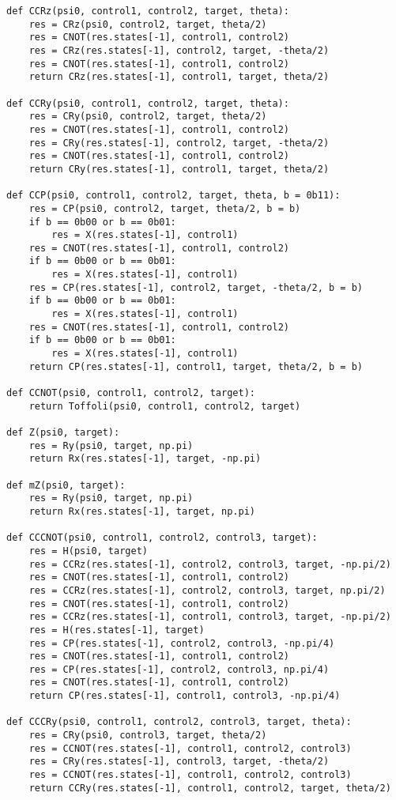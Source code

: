 \begin{verbatim}
def CCRz(psi0, control1, control2, target, theta):
    res = CRz(psi0, control2, target, theta/2)
    res = CNOT(res.states[-1], control1, control2)
    res = CRz(res.states[-1], control2, target, -theta/2)
    res = CNOT(res.states[-1], control1, control2)
    return CRz(res.states[-1], control1, target, theta/2)

def CCRy(psi0, control1, control2, target, theta):
    res = CRy(psi0, control2, target, theta/2)
    res = CNOT(res.states[-1], control1, control2)
    res = CRy(res.states[-1], control2, target, -theta/2)
    res = CNOT(res.states[-1], control1, control2)
    return CRy(res.states[-1], control1, target, theta/2)

def CCP(psi0, control1, control2, target, theta, b = 0b11):
    res = CP(psi0, control2, target, theta/2, b = b)
    if b == 0b00 or b == 0b01:
        res = X(res.states[-1], control1)
    res = CNOT(res.states[-1], control1, control2)
    if b == 0b00 or b == 0b01:
        res = X(res.states[-1], control1)
    res = CP(res.states[-1], control2, target, -theta/2, b = b)
    if b == 0b00 or b == 0b01:
        res = X(res.states[-1], control1)
    res = CNOT(res.states[-1], control1, control2)
    if b == 0b00 or b == 0b01:
        res = X(res.states[-1], control1)
    return CP(res.states[-1], control1, target, theta/2, b = b)

def CCNOT(psi0, control1, control2, target):
    return Toffoli(psi0, control1, control2, target)

def Z(psi0, target):
    res = Ry(psi0, target, np.pi)
    return Rx(res.states[-1], target, -np.pi)

def mZ(psi0, target):
    res = Ry(psi0, target, np.pi)
    return Rx(res.states[-1], target, np.pi)

def CCCNOT(psi0, control1, control2, control3, target):
    res = H(psi0, target)
    res = CCRz(res.states[-1], control2, control3, target, -np.pi/2)
    res = CNOT(res.states[-1], control1, control2)
    res = CCRz(res.states[-1], control2, control3, target, np.pi/2)
    res = CNOT(res.states[-1], control1, control2)
    res = CCRz(res.states[-1], control1, control3, target, -np.pi/2)
    res = H(res.states[-1], target)
    res = CP(res.states[-1], control2, control3, -np.pi/4)
    res = CNOT(res.states[-1], control1, control2)
    res = CP(res.states[-1], control2, control3, np.pi/4)
    res = CNOT(res.states[-1], control1, control2)
    return CP(res.states[-1], control1, control3, -np.pi/4)

def CCCRy(psi0, control1, control2, control3, target, theta):
    res = CRy(psi0, control3, target, theta/2)
    res = CCNOT(res.states[-1], control1, control2, control3)
    res = CRy(res.states[-1], control3, target, -theta/2)
    res = CCNOT(res.states[-1], control1, control2, control3)
    return CCRy(res.states[-1], control1, control2, target, theta/2)


\end{verbatim}
